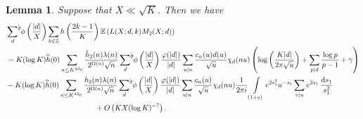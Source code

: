 \documentclass[10pt,a4paper]{amsart}
\newtheorem{lemma}{Lemma}
\newcommand\Z{\mathbb{Z}}
\newcommand\eps{\varepsilon}
\newcommand{\sumflat}{\mathop{{\sum}^{\raisebox{-3pt}{\makebox[0pt][l]{$\flat$}}}}}
\begin{document}
\begin{lemma}\label{random-averaged}
Suppose that $X\ll\sqrt K$. Then we have
\begin{align*}
&\sumflat_{d}\,\phi\left(\frac{|d|}X\right)\sum_{k\in\Z}h\left(\frac{2k-1}K\right)\mathbb E\left(L(X;d,k)M_2(X;d)\right)\\
&=K(\log K)\widehat h(0)\sum_{n\leq K^{4\delta_0}}\frac{\breve h_2(n)\lambda(n)}{2^{\Omega(n)}\sqrt n}\sumflat_{d}\,\phi\left(\frac{|d|}X\right)\frac{\varphi(|d|)}{|d|}\sum_{u|n}\frac{c_n(u)d(u)}{\sqrt u}\chi_d(nu)\left(\log\left(\frac{K|d|}{2\pi\sqrt u}\right)+\sum_{p|d}\frac{\log p}{p-1}+\gamma\right)\\
&-K(\log K)\widehat h(0)\sum_{n\leq K^{4\delta_0}}\frac{h_2(n)\lambda(n)}{2^{\Omega(n)}\sqrt n}\sumflat_{d}\,\phi\left(\frac{|d|}X\right)\frac{\varphi(|d|)}{|d|}\sum_{u|n}\frac{c_n(u)}{\sqrt u}\chi_d(nu)\frac1{2\pi i}\int\limits_{(1+\eps)}e^{2s_1^2}u^{-s_1}\sum_{v|u}v^{2s_1}\,\frac{\mathrm d s_1}{s_1^2}\\&\qquad\qquad\qquad\qquad\qquad\qquad+O\left(KX(\log K)^{-7}\right).
\end{align*}  
\end{lemma}
\end{document}
